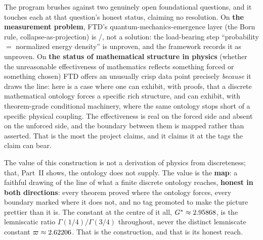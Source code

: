  The program brushes against two
genuinely open foundational questions, and it touches each at that question's
honest status, claiming no resolution. On \textbf{the measurement problem}, FTD's
quantum-mechanics-emergence layer (the Born rule, collapse-as-projection) is
/, not a solution: the load-bearing step ``probability
$=$ normalized energy density'' is unproven, and the framework records it as
unproven. On \textbf{the status of mathematical structure in physics} (whether
the unreasonable effectiveness of mathematics reflects something forced or
something chosen) FTD offers an unusually crisp data point precisely
\emph{because} it draws the line: here is a case where one can exhibit, with
proofs, that a discrete mathematical ontology forces a specific rich structure,
and can exhibit, with theorem-grade conditional machinery, where the same
ontology stops short of a specific physical coupling. The effectiveness is real
on the forced side and absent on the unforced side, and the boundary between them
is mapped rather than asserted. That is the most the project claims, and it
claims it at the tags the claim can bear.

 The value of this construction is not a
derivation of physics from discreteness; that, Part~II shows, the ontology
does not supply. The value is the \textbf{map}: a faithful drawing of the line of
what a finite discrete ontology reaches, \textbf{honest in both
directions}: every theorem proved where the ontology forces, every boundary
marked where it does not, and no tag promoted to make the picture prettier than
it is. The constant at the centre of it all, $G^{*}\approx2.95868$, is the
lemniscatic ratio $\Gamma(1/4)/\Gamma(3/4)$ throughout, never the distinct
lemniscate constant $\varpi\approx2.62206$. That is the construction, and
that is its honest reach.
